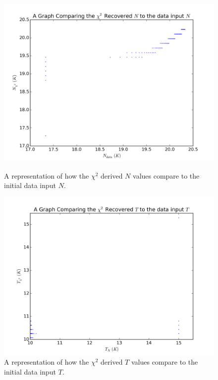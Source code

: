 \documentclass{report}
\begin{document}
\begin{figure}[H]
  \includegraphics[width=\linewidth]{../img/sim/N.png}
  \caption{A representation of how the $\chi^{2}$ derived $N$ values compare to the initial data input $N$.}\label{fig:iso_T}
\endminipage\hfill
{}
  \includegraphics[width=\linewidth]{../img/sim/T.png}
  \caption{A representation of how the $\chi^{2}$ derived $T$ values compare to the initial data input $T$.}\label{fig:iso_N}
\endminipage
\end{figure}
\end{document}
